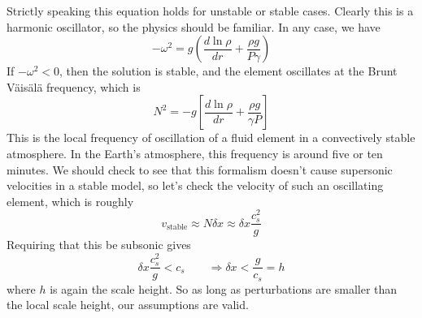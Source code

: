 \documentclass[10pt]{article}
\numberwithin{equation}{section}
\begin{document}
Strictly speaking this equation holds for unstable or stable
cases. Clearly this is a harmonic oscillator, so the physics should be
familiar. In any case, we have
\begin{equation}
  \label{eq:28}
  -\omega^2=g\left(\frac{d\ln\rho}{dr}+\frac{\rho g}{P \gamma}\right)
\end{equation}
If $-\omega^2<0$, then the solution is stable, and the element
oscillates at the Brunt V\"{a}is\"{a}l\"{a} frequency, which is 
\begin{equation}
  \label{eq:29}
  N^2=-g\left[\frac{d\ln\rho}{dr}+\frac{\rho g}{\gamma P}\right]
\end{equation}
This is the local frequency of oscillation of a fluid element in a
convectively stable atmosphere. In the Earth's atmosphere, this
frequency is around five or ten minutes. We should check to see that this
formalism doesn't cause supersonic velocities in a stable model, so let's check
the velocity of such an oscillating element, which is roughly
\begin{equation}
	\label{eq:conv_vel:1} v_{\mathrm{stable}} \approx N\delta x \approx \delta
x\frac{c_s^2}{g}
\end{equation}
Requiring that this be subsonic gives
\begin{equation}
	\label{eq:conv_vel:2} \delta x\frac{c_s^2}{g} < c_s \qquad \Rightarrow \delta
x < \frac{g}{c_s} = h
\end{equation}
where $h$ is again the scale height. So as long as perturbations are smaller
than the local scale height, our assumptions are valid.\\
\end{document}
